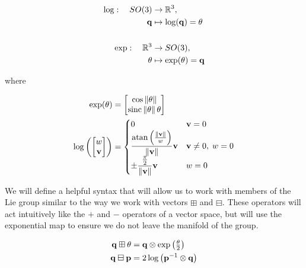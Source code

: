 \documentclass[letterpaper, 10 pt, conference]{ieeeconf}  %
\newcommand{\norm}[1]{\left\lVert#1\right\rVert}
\begin{document}
\begin{equation}
\begin{aligned}
	\log: \quad SO(3) &\rightarrow \mathbb{R}^3, \\
	\mathbf{q} &\mapsto \log(\mathbf{q}) = \mathbf{\theta} \\ \\
	\exp: \quad \mathbb{R}^3 &\rightarrow SO(3), \\
	\mathbf{\theta} &\mapsto \exp(\mathbf{\theta}) = \mathbf{q} 
\end{aligned}
\end{equation}

where

\begin{equation}
\begin{aligned}
	\exp(\btheta) &= \begin{bmatrix} \cos \norm{\btheta} \\ \textrm{sinc} \norm{\btheta} \btheta \end{bmatrix} \\
	\log\left(\begin{bmatrix} w \\ \vel \end{bmatrix} \right) &=  \begin{cases} 
														0 & \vel = 0  \\
														\dfrac{\atan\left(\tfrac{\norm{\vel}}{w}\right)}{\norm{\vel}}\vel & \vel \neq 0, \; w = 0 \\ 
														\pm \dfrac{\tfrac{\pi}{2}}{\norm{\vel}}\vel & w = 0
													\end{cases}
\end{aligned}
\end{equation}

We will define a helpful syntax that will allow us to work with members of the Lie group similar to the way we work with vectors $\boxplus$ and $\boxminus$.  These operators will act intuitively like the $+$ and $-$ operators of a vector space, but will use the exponential map to ensure we do not leave the manifold of the group.


\begin{equation}
\begin{aligned}
	\mathbf{q} \boxplus \mathbf{\theta} &= \mathbf{q} \otimes \exp\left(\tfrac{\mathbf{\theta}}{2}\right) \\
	\mathbf{q} \boxminus \mathbf{p} &= 2 \log\left(\mathbf{p}^{-1} \otimes \mathbf{q}\right)
\end{aligned}
\end{equation}
\end{document}
